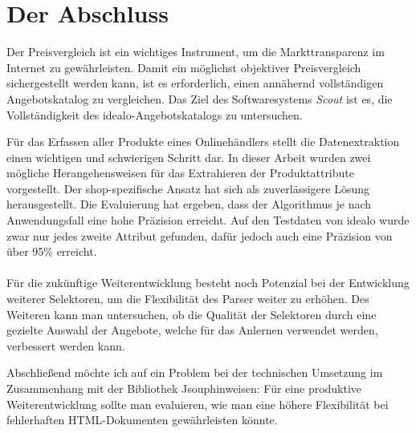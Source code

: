 \section{Der Abschluss}

Der Preisvergleich ist ein wichtiges Instrument, um die Markttransparenz im Internet zu gewährleisten.
Damit ein möglichst objektiver Preisvergleich sichergestellt werden kann, ist es erforderlich, einen annähernd
vollständigen Angebotskatalog zu vergleichen.
Das Ziel des Softwaresystems \textit{Scout} ist es, die Vollständigkeit des idealo-Angebotskatalogs zu untersuchen.

Für das Erfassen aller Produkte eines Onlinehändlers stellt die Datenextraktion einen wichtigen und schwierigen
Schritt dar.
In dieser Arbeit wurden zwei mögliche Herangehensweisen für das Extrahieren der Produktattribute vorgestellt.
Der shop-spezifische Ansatz hat sich als zuverlässigere Lösung herausgestellt.
Die Evaluierung hat ergeben, dass der Algorithmus je nach Anwendungsfall eine hohe Präzision erreicht.
Auf den Testdaten von idealo wurde zwar nur jedes zweite Attribut gefunden, dafür jedoch auch eine Präzision von über
95\% erreicht.
\\
~\\
Für die zukünftige Weiterentwicklung besteht noch Potenzial bei der Entwicklung weiterer Selektoren, um die
Flexibilität des Parser weiter zu erhöhen.
Des Weiteren kann man untersuchen, ob die Qualität der Selektoren durch eine gezielte Auswahl der Angebote, welche
für das Anlernen verwendet werden, verbessert werden kann.

Abschließend möchte ich auf ein Problem bei der technischen Umsetzung im Zusammenhang mit der Bibliothek
Jsoup\footnotemark hinweisen: Für eine produktive Weiterentwicklung sollte man evaluieren, wie man eine höhere
Flexibilität bei fehlerhaften HTML-Dokumenten gewährleisten könnte.
